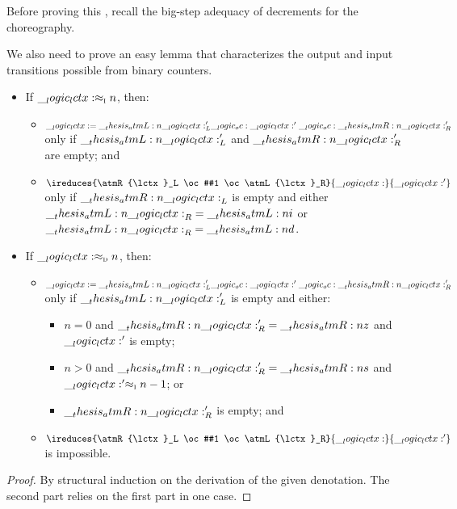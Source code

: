 Before proving this , recall the big-step adequacy of decrements for the choreography.
\coroocounteradequacy*

We also need to prove an easy lemma that characterizes the  output and input transitions possible from binary counters.
\begin{lemma}\label{lem:ordered-bisimilarity:oo-counter-bisim-easy}\leavevmode
  \begin{itemize}[nosep]
  \item
    If $\__logic_lctx: \approx\sb{\text{\normalfont\scshape i}} n$, then:
    \begin{itemize}[nosep]
    \item $\__logic_lctx: = \__thesis_atmL:n {\__logic_lctx:}'_L \__logic_oc: \__logic_lctx:' \__logic_oc: \__thesis_atmR:n {\__logic_lctx:}'_R$ only if $\__thesis_atmL:n {\__logic_lctx:}'_L$ and $\__thesis_atmR:n {\__logic_lctx:}'_R$ are empty; and
    \item $\ireduces{\atmR{\lctx}_L \oc #1 \oc \atmL{\lctx}_R}{\lctx}{\lctx'}$ only if $\__thesis_atmR:n {\__logic_lctx:}_L$ is empty and either $\__thesis_atmL:n {\__logic_lctx:}_R = \__thesis_atmL:n {i}$ or $\__thesis_atmL:n {\__logic_lctx:}_R = \__thesis_atmL:n {d}$.
    \end{itemize}

  \item
    If $\__logic_lctx: \approx\sb{\text{\normalfont\scshape d}} n$, then:
    \begin{itemize}[nosep]
    \item $\__logic_lctx: = \__thesis_atmL:n {\__logic_lctx:}'_L \__logic_oc: \__logic_lctx:' \__logic_oc: \__thesis_atmR:n {\__logic_lctx:}'_R$ only if
      $\__thesis_atmL:n {\__logic_lctx:}'_L$ is empty and either:
      \begin{itemize}[nosep]
      \item $n=0$ and $\__thesis_atmR:n {\__logic_lctx:}'_R = \__thesis_atmR:n {z}$ and $\__logic_lctx:'$ is empty;
      \item $n > 0$ and $\__thesis_atmR:n {\__logic_lctx:}'_R = \__thesis_atmR:n {s}$ and $\__logic_lctx:' \approx\sb{\text{\normalfont\scshape i}} n-1$; or
      \item $\__thesis_atmR:n {\__logic_lctx:}'_R$ is empty; and
      \end{itemize}

    \item
      $\ireduces{\atmR{\lctx}_L \oc #1 \oc \atmL{\lctx}_R}{\lctx}{\lctx'}$ is impossible.
    \end{itemize}
  \end{itemize}
\end{lemma}
\begin{proof}
  By structural induction on the derivation of the given denotation.
  The second part relies on the first part in one case.
\end{proof}

